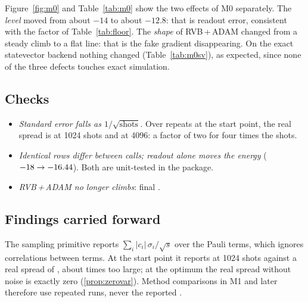 Figure~\ref{fig:m0} and Table~\ref{tab:m0} show the two effects of M0 separately. The
\emph{level} moved from about $-14$ to about $-12.8$: that is readout error, consistent with the
factor \VKeepHvaReadout{} of Table~\ref{tab:floor}. The \emph{shape} of RVB\,+\,ADAM changed from
a steady climb to a flat line: that is the fake gradient disappearing. On the exact
statevector backend nothing changed (Table~\ref{tab:m0sv}), as expected, since none of the three
defects touches exact simulation.

\begin{table}[H]
  \centering
  
  \caption{Exact statevector benchmark, for reference. HVA returns to zero parameters exactly;
    RVB with SPSA stops at \VSvErrRvbSpsa.}
  \label{tab:m0sv}
\end{table}

\subsection{Checks}

\begin{itemize}
  \item \emph{Standard error falls as $1/\sqrt{\text{shots}}$.} Over \VSpreadRepeats{} repeats at
    the start point, the real spread is \VSpreadLowReal{} at 1024 shots and \VSpreadHighReal{} at
    4096: a factor of two for four times the shots.
  \item \emph{Identical rows differ between calls; readout alone moves the energy}
    ($-18\to-16.44$). Both are unit-tested in the package.
  \item \emph{RVB\,+\,ADAM no longer climbs}: final \VPostFinalRvbAdam.
\end{itemize}

\subsection{Findings carried forward}

\begin{rem}\label{rem:stdbound}
  The sampling primitive reports $\sum_i|c_i|\,\sigma_i/\sqrt{s}$ over the Pauli terms, which
  ignores correlations between terms. At the start point it reports \VSpreadLowReported{} at
  1024 shots against a real spread of \VSpreadLowReal{}, about \VSpreadRatio{} times too large;
  at the optimum the real spread without noise is exactly zero (\cref{prop:zerovar}). Method comparisons in M1
  and later therefore use repeated runs, never the reported .
\end{rem}

